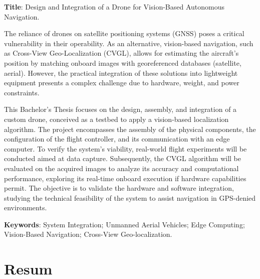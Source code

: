\begin{ParrafoIngles}

\noindent\textbf{Title}: Design and Integration of a Drone for Vision-Based Autonomous Navigation.

The reliance of drones on satellite positioning systems (GNSS) poses a critical vulnerability in their operability. As an alternative, vision-based navigation, such as Cross-View Geo-Localization (CVGL), allows for estimating the aircraft's position by matching onboard images with georeferenced databases (satellite, aerial). However, the practical integration of these solutions into lightweight equipment presents a complex challenge due to hardware, weight, and power constraints.

This Bachelor's Thesis focuses on the design, assembly, and integration of a custom drone, conceived as a testbed to apply a vision-based localization algorithm. The project encompasses the assembly of the physical components, the configuration of the flight controller, and its communication with an edge computer. To verify the system's viability, real-world flight experiments will be conducted aimed at data capture. Subsequently, the CVGL algorithm will be evaluated on the acquired images to analyze its accuracy and computational performance, exploring its real-time onboard execution if hardware capabilities permit. The objective is to validate the hardware and software integration, studying the technical feasibility of the system to assist navigation in GPS-denied environments.

\textbf{Keywords}: System Integration; Unmanned Aerial Vehicles; Edge Computing; Vision-Based Navigation; Cross-View Geo-localization.

\end{ParrafoIngles}

\clearpage

\section*{Resum}

